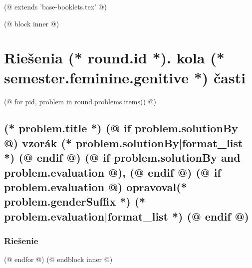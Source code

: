 (@ extends 'base-booklets.tex' @)

(@ block inner @)
    \pagestyle{seminar-booklet-body}

    \section{\texorpdfstring{Riešenia (* round.id *). kola (* semester.feminine.genitive *) časti}{Riešenia}}
    \setcounter{volume}{(* volume.number *)}%
    \setcounter{semester}{(* semester.number *)}%
    \setcounter{round}{(* round.number *)}%
    \setcounter{section}{(* round.number *)}%

    (@ for pid, problem in round.problems.items() @)%
        \setcounter{problem}{(* problem.number *)}%

        \subsection{%
            \texorpdfstring{%
                \large \textbf{(* problem.title *)} \hfill \normalsize%
                (@ if problem.solutionBy @)%
                    vzorák (* problem.solutionBy|format_list *)%
                (@ endif @)%
                (@ if problem.solutionBy and problem.evaluation @), (@ endif @)%
                (@ if problem.evaluation @)%
                    opravoval(* problem.genderSuffix *) (* problem.evaluation|format_list *)%
                (@ endif @)%
            }{(* round.number *).(* problem.number *) (* problem.title *)}%
        }

        \subsubsection{Riešenie}
    (@ endfor @)
(@ endblock inner @)
